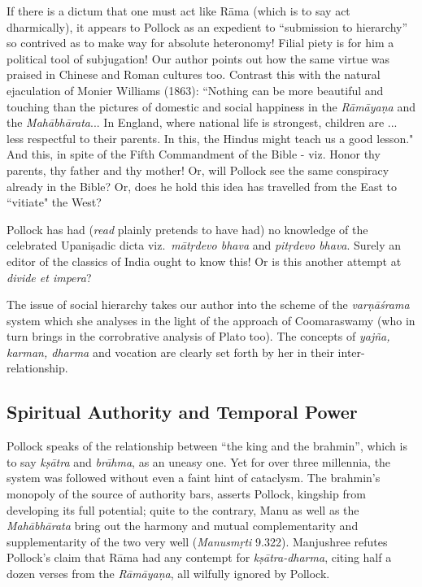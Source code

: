 If there is a dictum that one must act like Rāma (which is to say act dharmically), it appears to Pollock as an expedient to “submission to hierarchy” so contrived as to make way for absolute heteronomy! Filial piety is for him a political tool of subjugation! Our author points out how the same virtue was praised in Chinese and Roman cultures too. Contrast this with the natural ejaculation of Monier Williams (1863): “Nothing can be more beautiful and touching than the pictures of domestic and social happiness in the {\sl Rāmāyaṇa} and the {\sl Mahābhārata}... In England, where national life is strongest, children are ... less respectful to their parents. In this, the Hindus might teach us a good lesson." And this, in spite of the Fifth Commandment of the Bible - viz. Honor thy parents, thy father and thy mother! Or, will Pollock see the same conspiracy already in the Bible? Or, does he hold this idea has travelled from the East to “vitiate" the West?

Pollock has had ({\sl read} plainly pretends to have had) no knowledge of the celebrated Upaniṣadic dicta viz.\ {\sl mātṛdevo bhava} and {\sl pitṛdevo bhava}. Surely an editor of the classics of India ought to know this! Or is this another attempt at {\sl divide et impera}?

The issue of social hierarchy takes our author into the scheme of the {\sl varṇāśrama} system which she analyses in the light of the approach of Coomaraswamy (who in turn brings in the corrobrative analysis of Plato too). The concepts of {\sl yajña, karman, dharma} and vocation are clearly set forth by her in their inter-relationship.\\[-20pt]

\subsection*{Spiritual Authority and Temporal Power}

Pollock speaks of the relationship between “the king and the brahmin”, which is to say {\sl kṣātra} and {\sl brāhma}, as an uneasy one. Yet for over three millennia, the system was followed without even a faint hint of cataclysm. The brahmin's monopoly of the source of authority bars, asserts Pollock, kingship from developing its full potential; quite to the contrary, Manu as well as the {\sl Mahābhārata} bring out the harmony and mutual complementarity and supplementarity of the two very well ({\sl Manusmṛti} 9.322). Manjushree refutes Pollock's claim that Rāma had any contempt for {\sl kṣātra-dharma}, citing half a dozen verses from the {\sl Rāmāyaṇa}, all wilfully ignored by Pollock.

